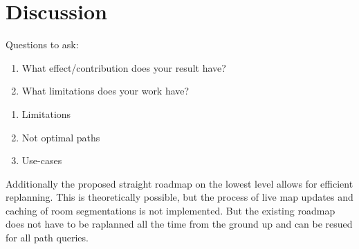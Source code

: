 \chapter{Discussion}
\label{sec:discussion}
Questions to ask:
\begin{enumerate}
    \item What effect/contribution does your result have?
    \item What limitations does your work have?
\end{enumerate}

\begin{enumerate}
    \item Limitations
    \item Not optimal paths
    \item Use-cases
\end{enumerate}

Additionally the proposed straight roadmap on the lowest level allows for efficient replanning. This is theoretically possible, but the process of live map updates and caching of room segmentations is not implemented. But the existing roadmap does not have to be raplanned all the time from the ground up and can be resued for all path queries.